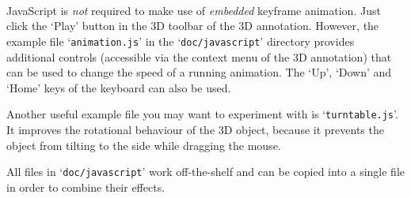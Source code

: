 \documentclass[a4paper]{article}
\begin{document}
\begin{enumerate}
  {\tt%
    \string{}\string{\\
    \phantom{xx}.5\string\linewidth\\
    \string}\string{\\
    \phantom{xx}.5\string\linewidth\\
    \string}
  }

  JavaScript is \emph{not} required to make use of \emph{embedded} keyframe animation. Just click the `Play' button in the 3D toolbar of the 3D annotation. However, the example file `{\tt{}animation.js}' in the `{\tt{}doc/javascript}' directory provides additional controls (accessible via the context menu of the 3D annotation) that can be used to change the speed of a running animation. The `Up', `Down' and `Home' keys of the keyboard can also be used.
  
  Another useful example file you may want to experiment with is `{\tt{}turn\-table.js}'. It improves the rotational behaviour of the 3D object, because it prevents the object from tilting to the side while dragging the mouse.

  All files in `{\tt{}doc/javascript}' work off-the-shelf and can be copied into a single file in order to combine their effects.

\end{enumerate}
\end{document}
